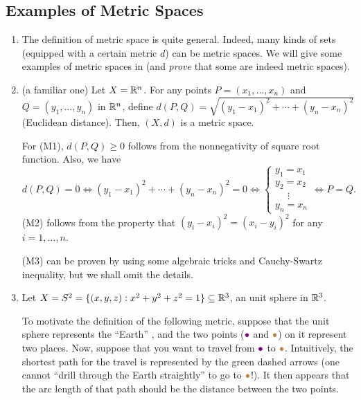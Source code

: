 \subsection{Examples of Metric Spaces}
\label{subsect:metric-sp-eg}
\begin{enumerate}
\item The definition of metric space is quite general. Indeed, many kinds of
sets (equipped with a certain metric \(d\)) can be metric spaces. We will give
some examples of metric spaces in  (and \emph{prove}
that some are indeed metric spaces).

\item \label{it:metric-rn}
(a familiar one) Let \(X=\mathbb{R}^n\). For any points \(P=(x_1,\dotsc,x_n)\)
and \(Q=(y_1,\dotsc,y_n)\) in \(\mathbb{R}^n\), define
\(d(P,Q)=\sqrt{(y_1-x_1)^{2}+\dotsb+(y_n-x_n)^{2}}\) (Euclidean distance).
Then, \((X,d)\) is a metric space.

\begin{pf}
For (M1), \(d(P,Q)\ge 0\) follows from the nonnegativity of square root
function. Also, we have
\[
d(P,Q)=0\iff (y_1-x_1)^{2}+\dotsb+(y_n-x_n)^{2}=0
\iff \begin{cases}
y_1=x_1\\
y_2=x_2\\
\quad\;\vdots\\
y_n=x_n
\end{cases}
\iff
P=Q.
\]
(M2) follows from the property that \((y_i-x_i)^{2}=(x_i-y_i)^{2}\) for any
\(i=1,\dotsc,n\).

(M3) can be proven by using some algebraic tricks and Cauchy-Swartz inequality,
but we shall omit the details.
\end{pf}

\item Let \(X=S^2=\{(x,y,z):x^2+y^2+z^2=1\}\subseteq\mathbb{R}^3\), an unit sphere in
\(\mathbb{R}^3\).
\begin{center}
\end{center}
To motivate the definition of the following metric, suppose that the unit
sphere represents the ``Earth'' , and the two points
(\({\color{violet}\bullet}\) and \({\color{brown}\bullet}\)) on it represent
two places. Now, suppose that you want to travel  from
\({\color{violet}\bullet}\) to \({\color{brown}\bullet}\). Intuitively, the
shortest path for the travel is represented by the {\color{green!50!black}green
dashed arrows} (one cannot ``drill through the Earth straightly'' to go to
\({\color{brown}\bullet}\)!). It then appears that the arc length of that path
should be the distance between the two points.


\end{enumerate}
